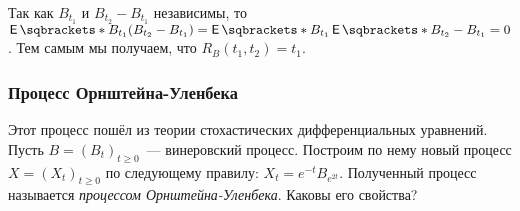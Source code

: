 Так как \(B_{t_{1}}\) и \(B_{t_{2}} - B_{t_{1}}\) независимы, то 
\(\E{B_{t_{1}}(B_{t_{2}} - B_{t_{1}})} = \E{B_{t_{1}}}\E{B_{t_{2}} - 
B_{t_{1}}} = 0\). Тем самым мы получаем, что \(R_{B}(t_{1}, t_{2}) = t_{1}\).

\subsubsection{Процесс Орнштейна-Уленбека}\label{ornstein-uhlenbeck-process}
Этот процесс пошёл из теории стохастических дифференциальных уравнений. Пусть 
\(B = (B_{t})_{t \geq 0}\)~--- винеровский процесс. Построим по нему новый 
процесс \(X = (X_{t})_{t \geq 0}\) по следующему правилу: \(X_{t} = 
e^{-t}B_{e^{2t}}\). Полученный процесс называется \emph{процессом 
Орнштейна-Уленбека}. Каковы его свойства?

